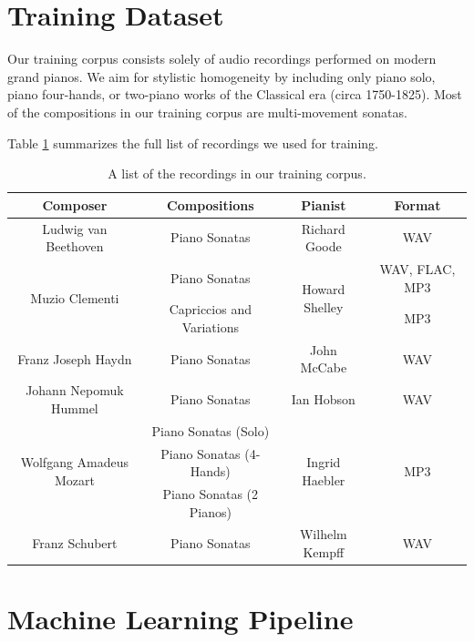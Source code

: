 \documentclass{article}
\begin{document}
\section{Training Dataset}

Our training corpus consists solely of audio recordings performed on modern grand pianos. We aim for stylistic homogeneity by including only piano solo, piano four-hands, or two-piano works of the Classical era (circa 1750-1825). Most of the compositions in our training corpus are multi-movement sonatas.

Table \ref{tab:training_corpus} summarizes the full list of recordings we used for training.

\begin{table}
    \centering
    \begin{tabular}{cccc}
        \toprule
        Composer & Compositions & Pianist & Format \\
        \toprule
        Ludwig van Beethoven & Piano Sonatas & Richard Goode & WAV \\
        \midrule
        \multirow{2}{*}{Muzio Clementi} & Piano Sonatas & \multirow{2}{*}{Howard Shelley} & WAV, FLAC, MP3 \\
        \cmidrule{2-2}
        \cmidrule{4-4}
        & Capriccios and Variations & & MP3 \\
        \midrule
        Franz Joseph Haydn & Piano Sonatas & John McCabe & WAV \\
        \midrule
        Johann Nepomuk Hummel & Piano Sonatas & Ian Hobson & WAV \\
        \midrule
        \multirow{3}{*}{Wolfgang Amadeus Mozart} & Piano Sonatas (Solo) & \multirow{3}{*}{Ingrid Haebler} & \multirow{3}{*}{MP3} \\
        \cmidrule{2-2}
        & Piano Sonatas (4-Hands) & & \\
        \cmidrule{2-2}
        & Piano Sonatas (2 Pianos) & & \\
        \midrule
        Franz Schubert & Piano Sonatas & Wilhelm Kempff & WAV \\
        \bottomrule
    \end{tabular}
    \caption{A list of the recordings in our training corpus.}
    \label{tab:training_corpus}
\end{table}

\section{Machine Learning Pipeline}
\end{document}
